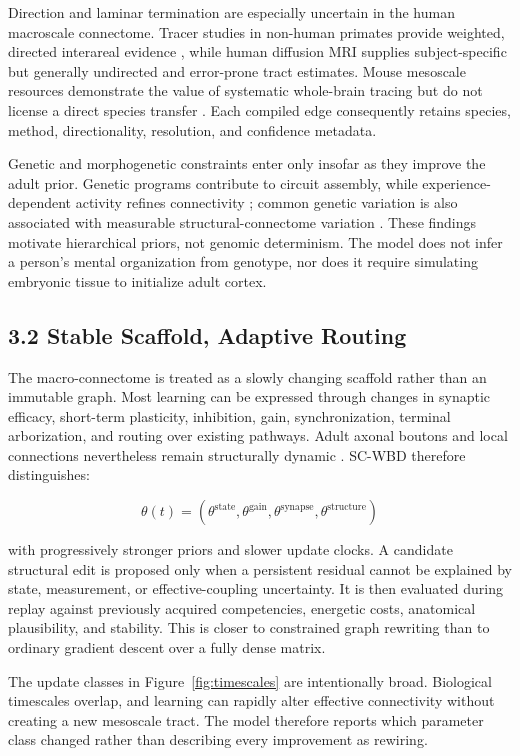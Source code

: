 Direction and laminar termination are especially uncertain in the human
macroscale connectome. Tracer studies in non-human primates provide weighted,
directed interareal evidence \citep{markov2014}, while human diffusion MRI
supplies subject-specific but generally undirected and error-prone tract
estimates. Mouse mesoscale resources demonstrate the value of systematic
whole-brain tracing but do not license a direct species transfer
\citep{oh2014}. Each compiled edge consequently retains species, method,
directionality, resolution, and confidence metadata.

Genetic and morphogenetic constraints enter only insofar as they improve the
adult prior. Genetic programs contribute to circuit assembly, while
experience-dependent activity refines connectivity \citep{luo2021}; common
genetic variation is also associated with measurable structural-connectome
variation \citep{wainberg2024}. These findings motivate hierarchical priors,
not genomic determinism. The model does not infer a person's mental
organization from genotype, nor does it require simulating embryonic tissue to
initialize adult cortex.

\subsection{3.2 Stable Scaffold, Adaptive Routing}

The macro-connectome is treated as a slowly changing scaffold rather than an
immutable graph. Most learning can be expressed through changes in synaptic
efficacy, short-term plasticity, inhibition, gain, synchronization, terminal
arborization, and routing over existing pathways. Adult axonal boutons and
local connections nevertheless remain structurally dynamic
\citep{stettler2006}. SC-WBD therefore distinguishes:

\[
\theta(t)=
\left(\theta^{\mathrm{state}},
\theta^{\mathrm{gain}},
\theta^{\mathrm{synapse}},
\theta^{\mathrm{structure}}\right)
\]

with progressively stronger priors and slower update clocks. A candidate
structural edit is proposed only when a persistent residual cannot be
explained by state, measurement, or effective-coupling uncertainty. It is then
evaluated during replay against previously acquired competencies, energetic
costs, anatomical plausibility, and stability. This is closer to constrained
graph rewriting than to ordinary gradient descent over a fully dense matrix.

The update classes in Figure~\ref{fig:timescales} are intentionally broad.
Biological timescales overlap, and learning can rapidly alter effective
connectivity without creating a new mesoscale tract. The model therefore
reports which parameter class changed rather than describing every improvement
as rewiring.

